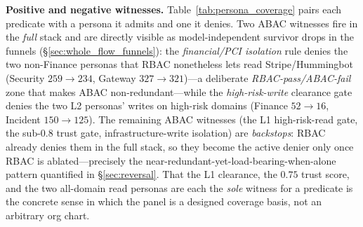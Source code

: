 \documentclass[sigconf,review,anonymous]{acmart}
\begin{document}
\textbf{Positive and negative witnesses.} Table~\ref{tab:persona_coverage} pairs each predicate with a persona it admits and one it denies. Two ABAC witnesses fire in the \emph{full} stack and are directly visible as model-independent survivor drops in the funnels (\S\ref{sec:whole_flow_funnels}): the \emph{financial/PCI isolation} rule denies the two non-Finance personas that RBAC nonetheless lets read Stripe/Hummingbot (Security $259\!\to\!234$, Gateway $327\!\to\!321$)---a deliberate \emph{RBAC-pass/ABAC-fail} zone that makes ABAC non-redundant---while the \emph{high-risk-write} clearance gate denies the two L2 personas' writes on high-risk domains (Finance $52\!\to\!16$, Incident $150\!\to\!125$). The remaining ABAC witnesses (the L1 high-risk-read gate, the sub-$0.8$ trust gate, infrastructure-write isolation) are \emph{backstops}: RBAC already denies them in the full stack, so they become the active denier only once RBAC is ablated---precisely the near-redundant-yet-load-bearing-when-alone pattern quantified in \S\ref{sec:reversal}. That the L1 clearance, the $0.75$ trust score, and the two all-domain read personas are each the \emph{sole} witness for a predicate is the concrete sense in which the panel is a designed coverage basis, not an arbitrary org chart.
\end{document}
